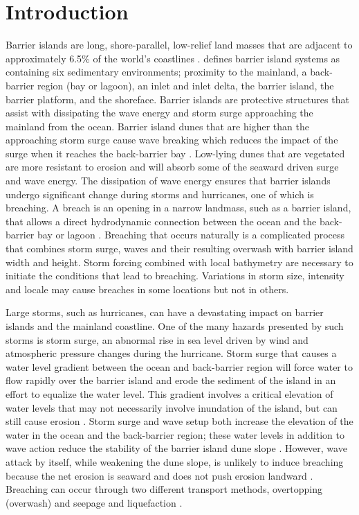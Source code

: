 \documentclass{coastal_paper}
\begin{document}
\section{Introduction}
Barrier islands are long, shore-parallel, low-relief land masses that are adjacent to approximately 6.5\% of the world's coastlines \citep{Oertel1985TheSystem,Stutz2001ADistribution}. \citet{Oertel1985TheSystem} defines barrier island systems as containing six sedimentary environments; proximity to the mainland, a back-barrier region (bay or lagoon), an inlet and inlet delta, the barrier island, the barrier platform, and the shoreface. Barrier islands are protective structures that assist with dissipating the wave energy and storm surge approaching the mainland from the ocean. Barrier island dunes that are higher than the approaching storm surge cause wave breaking which reduces the impact of the surge when it reaches the back-barrier bay \citep{Oertel1985TheSystem, Irish2010}. Low-lying dunes that are vegetated are more resistant to erosion and will absorb some of the seaward driven surge and wave energy. The dissipation of wave energy ensures that barrier islands undergo significant change during storms and hurricanes, one of which is breaching. A breach is an opening in a narrow landmass, such as a barrier island, that allows a direct hydrodynamic connection between the ocean and the back-barrier bay or lagoon \citep{Kraus2003, Wamsley2005CoastalClosure}. Breaching that occurs naturally is a complicated process that combines storm surge, waves and their resulting overwash with barrier island width and height. Storm forcing combined with local bathymetry are necessary to initiate the conditions that lead to breaching. Variations in storm size, intensity and locale may cause breaches in some locations but not in others. 

Large storms, such as hurricanes, can have a devastating impact on barrier islands and the mainland coastline. One of the many hazards presented by such storms is storm surge, an abnormal rise in sea level driven by wind and atmospheric pressure changes during the hurricane. Storm surge that causes a water level gradient between the ocean and back-barrier region will force water to flow rapidly over the barrier island and erode the sediment of the island in an effort to equalize the water level. This gradient involves a critical elevation of water levels that may not necessarily involve inundation of the island, but can still cause erosion \citep{Kraus2002, Kraus2003}. Storm surge and wave setup both increase the elevation of the water in the ocean and the back-barrier region; these water levels in addition to wave action reduce the stability of the barrier island dune slope \citep{Kraus2003, Kraus2002}. However, wave attack by itself, while weakening the dune slope, is unlikely to induce breaching because the net erosion is seaward and does not push erosion landward \citep{Pierce1970}. Breaching can occur through two different transport methods, overtopping (overwash) and seepage and liquefaction \citep{Kraus2002, Kraus2003}.
\end{document}
